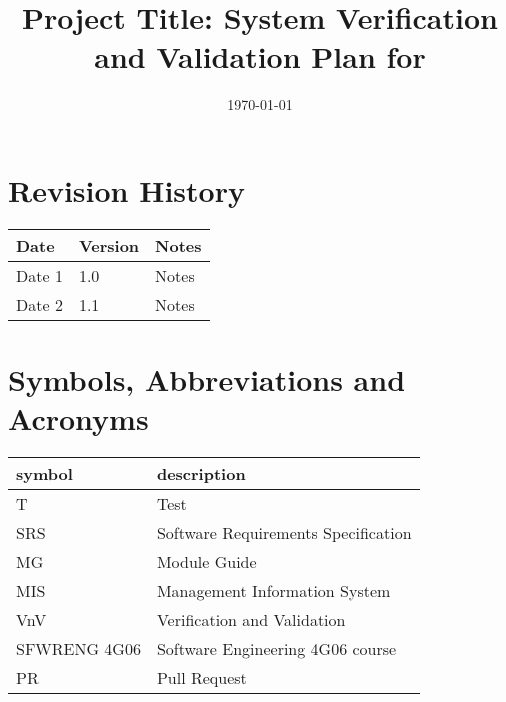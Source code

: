 \documentclass[12pt, titlepage]{article}
\begin{document}
	
	\title{Project Title: System Verification and Validation Plan for 
	\progname{}} 
	\author{\authname}
	\date{\today}
	
	\maketitle
	
	
	\section{Revision History}
	
	\begin{tabularx}{\textwidth}{p{3cm}p{2cm}X}
		\toprule {\bf Date} & {\bf Version} & {\bf Notes}\\
		\midrule
		Date 1 & 1.0 & Notes\\
		Date 2 & 1.1 & Notes\\
		\bottomrule
	\end{tabularx}
	
	\newpage
	
	\tableofcontents
	
	\listoftables
	
	\listoffigures
	
	\newpage
	
	\section{Symbols, Abbreviations and Acronyms}
	
	\renewcommand{\arraystretch}{1.2}
	\begin{tabular}{l l} 
		\toprule		
		\textbf{symbol} & \textbf{description}\\
		\midrule 
		T & Test\\
		SRS & Software Requirements Specification\\
		MG & Module Guide\\
		MIS & Management Information System\\
		VnV & Verification and Validation\\
		SFWRENG 4G06& Software Engineering 4G06 course\\
		PR& Pull Request\\
		\bottomrule
	\end{tabular}\\
	
	
\end{document}
